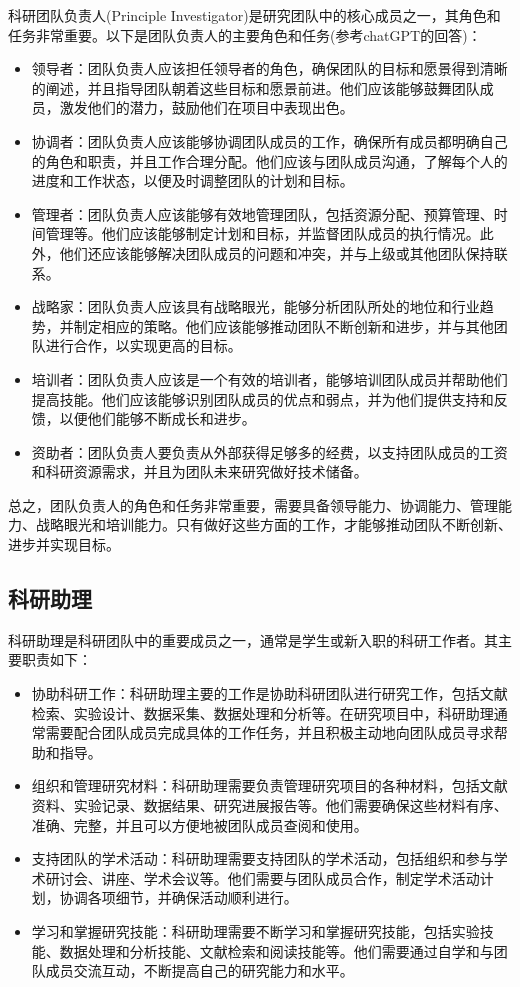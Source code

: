 \documentclass[
]{ctexbook}
\begin{document}
科研团队负责人(Principle Investigator)是研究团队中的核心成员之一，其角色和任务非常重要。以下是团队负责人的主要角色和任务(参考chatGPT的回答)：

\begin{itemize}
\item
  领导者：团队负责人应该担任领导者的角色，确保团队的目标和愿景得到清晰的阐述，并且指导团队朝着这些目标和愿景前进。他们应该能够鼓舞团队成员，激发他们的潜力，鼓励他们在项目中表现出色。
\item
  协调者：团队负责人应该能够协调团队成员的工作，确保所有成员都明确自己的角色和职责，并且工作合理分配。他们应该与团队成员沟通，了解每个人的进度和工作状态，以便及时调整团队的计划和目标。
\item
  管理者：团队负责人应该能够有效地管理团队，包括资源分配、预算管理、时间管理等。他们应该能够制定计划和目标，并监督团队成员的执行情况。此外，他们还应该能够解决团队成员的问题和冲突，并与上级或其他团队保持联系。
\item
  战略家：团队负责人应该具有战略眼光，能够分析团队所处的地位和行业趋势，并制定相应的策略。他们应该能够推动团队不断创新和进步，并与其他团队进行合作，以实现更高的目标。
\item
  培训者：团队负责人应该是一个有效的培训者，能够培训团队成员并帮助他们提高技能。他们应该能够识别团队成员的优点和弱点，并为他们提供支持和反馈，以便他们能够不断成长和进步。
\item
  资助者：团队负责人要负责从外部获得足够多的经费，以支持团队成员的工资和科研资源需求，并且为团队未来研究做好技术储备。
\end{itemize}

总之，团队负责人的角色和任务非常重要，需要具备领导能力、协调能力、管理能力、战略眼光和培训能力。只有做好这些方面的工作，才能够推动团队不断创新、进步并实现目标。

\hypertarget{ux79d1ux7814ux52a9ux7406}{%
\subsection{科研助理}\label{ux79d1ux7814ux52a9ux7406}}

科研助理是科研团队中的重要成员之一，通常是学生或新入职的科研工作者。其主要职责如下：

\begin{itemize}
\item
  协助科研工作：科研助理主要的工作是协助科研团队进行研究工作，包括文献检索、实验设计、数据采集、数据处理和分析等。在研究项目中，科研助理通常需要配合团队成员完成具体的工作任务，并且积极主动地向团队成员寻求帮助和指导。
\item
  组织和管理研究材料：科研助理需要负责管理研究项目的各种材料，包括文献资料、实验记录、数据结果、研究进展报告等。他们需要确保这些材料有序、准确、完整，并且可以方便地被团队成员查阅和使用。
\item
  支持团队的学术活动：科研助理需要支持团队的学术活动，包括组织和参与学术研讨会、讲座、学术会议等。他们需要与团队成员合作，制定学术活动计划，协调各项细节，并确保活动顺利进行。
\item
  学习和掌握研究技能：科研助理需要不断学习和掌握研究技能，包括实验技能、数据处理和分析技能、文献检索和阅读技能等。他们需要通过自学和与团队成员交流互动，不断提高自己的研究能力和水平。
\end{itemize}
\end{document}
